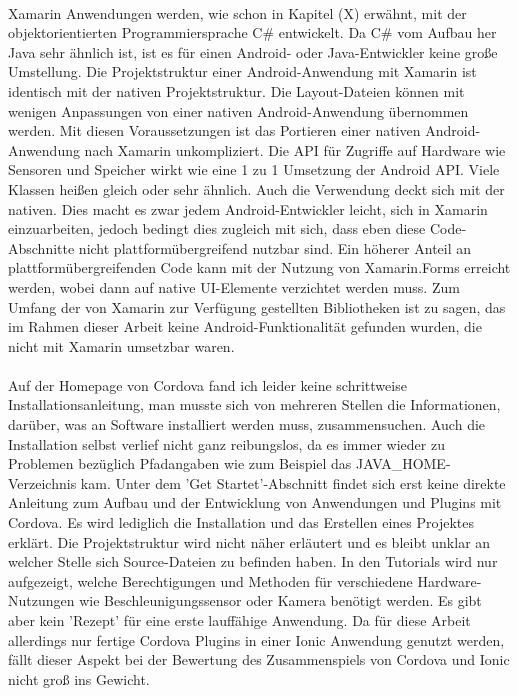 \\
Xamarin Anwendungen werden, wie schon in Kapitel (X) erwähnt, mit der objektorientierten Programmiersprache C\# entwickelt. Da C\# vom Aufbau her Java sehr ähnlich ist, ist es für einen Android- oder Java-Entwickler keine große Umstellung. Die Projektstruktur einer Android-Anwendung mit Xamarin ist identisch mit der nativen Projektstruktur. Die Layout-Dateien können mit wenigen Anpassungen von einer nativen Android-Anwendung übernommen werden. Mit diesen Voraussetzungen ist das Portieren einer nativen Android-Anwendung nach Xamarin unkompliziert. Die API für Zugriffe auf Hardware wie Sensoren und Speicher wirkt wie eine 1 zu 1 Umsetzung der Android API. Viele Klassen heißen gleich oder sehr ähnlich. Auch die Verwendung deckt sich mit der nativen. Dies macht es zwar jedem Android-Entwickler leicht, sich in Xamarin einzuarbeiten, jedoch bedingt dies zugleich mit sich, dass eben diese Code-Abschnitte nicht plattformübergreifend nutzbar sind. Ein höherer Anteil an plattformübergreifenden Code kann mit der Nutzung von Xamarin.Forms erreicht werden, wobei dann auf native UI-Elemente verzichtet werden muss. Zum Umfang der von Xamarin zur Verfügung gestellten Bibliotheken ist zu sagen, das im Rahmen dieser Arbeit keine Android-Funktionalität gefunden wurden, die nicht mit Xamarin umsetzbar waren. 
\\
\\
Auf der Homepage von Cordova fand ich leider keine schrittweise Installationsanleitung, man musste sich von mehreren Stellen die Informationen, darüber, was an Software installiert werden muss, zusammensuchen. Auch die Installation selbst verlief nicht ganz reibungslos, da es immer wieder zu Problemen bezüglich Pfadangaben wie zum Beispiel das JAVA\_HOME-Verzeichnis kam. Unter dem 'Get Startet'-Abschnitt findet sich erst keine direkte Anleitung zum Aufbau und der Entwicklung von Anwendungen und Plugins mit Cordova. Es wird lediglich die Installation und das Erstellen eines Projektes erklärt. Die Projektstruktur wird nicht näher erläutert und es bleibt unklar an welcher Stelle sich Source-Dateien zu befinden haben. In den Tutorials wird nur aufgezeigt, welche Berechtigungen und Methoden für verschiedene Hardware-Nutzungen wie Beschleunigungssensor oder Kamera benötigt werden. Es gibt aber kein 'Rezept' für eine erste lauffähige Anwendung. Da für diese Arbeit allerdings nur fertige Cordova Plugins in einer Ionic Anwendung genutzt werden, fällt dieser Aspekt bei der Bewertung des Zusammenspiels von Cordova und Ionic nicht groß ins Gewicht. 
\\
